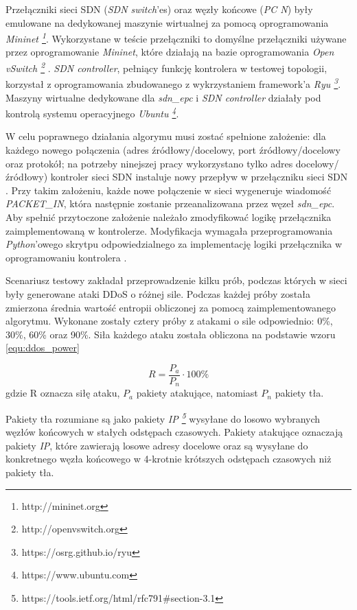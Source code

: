 Przełączniki sieci SDN (\textit{SDN switch}'es) oraz węzły końcowe (\textit{PC
  N}) były emulowane na dedykowanej maszynie wirtualnej za pomocą oprogramowania
\textit{Mininet \footnote{http://mininet.org}}. Wykorzystane w teście
przełączniki to domyślne przełączniki używane przez oprogramowanie
\textit{Mininet}, które działają na bazie oprogramowania
\textit{Open vSwitch \footnote{http://openvswitch.org}} \cite{mininetwiki}.
\textit{SDN controller}, pełniący funkcję kontrolera w testowej topologii,
korzystał z oprogramowania zbudowanego z wykrzystaniem framework'a
\textit{Ryu \footnote{https://osrg.github.io/ryu}}. Maszyny wirtualne dedykowane
dla \textit{sdn\_epc} i \textit{SDN controller} działały pod kontrolą systemu
operacyjnego \textit{Ubuntu \footnote{https://www.ubuntu.com}}.

W celu poprawnego działania algorymu musi zostać spełnione założenie: dla
każdego nowego połączenia (adres źródłowy/docelowy, port źródłowy/docelowy oraz
protokół; na potrzeby ninejszej pracy wykorzystano tylko adres
docelowy/źródłowy) kontroler sieci SDN instaluje nowy przepływ w przełączniku
sieci SDN \cite{mainddosarticle}. Przy takim założeniu, każde nowe połączenie w
sieci wygeneruje wiadomość \textit{PACKET\_IN}, która następnie zostanie
przeanalizowana przez węzeł \textit{sdn\_epc}. Aby spełnić przytoczone
założenie należało zmodyfikować logikę przełącznika zaimplementowaną w
kontrolerze. Modyfikacja wymagała przeprogramowania \textit{Python}'owego
skrytpu odpowiedzialnego za implementację logiki przełącznika w oprogramowaniu
kontrolera \cite{ryupage}.

Scenariusz testowy zakładał przeprowadzenie kilku prób, podczas których w sieci
były generowane ataki DDoS o różnej sile. Podczas każdej próby została zmierzona
średnia wartość entropii obliczonej za pomocą zaimplementowanego algorytmu.
Wykonane zostały cztery próby z atakami o sile odpowiednio: 0\%, 30\%, 60\% oraz
90\%. Siła każdego ataku została obliczona na podstawie wzoru
\ref{equ:ddos_power} \cite{mainddosarticle}

\begin{equation}
R = \frac{P_{a}}{P_{n}} \cdot 100\%
\label{equ:ddos_power}
\end{equation}
gdzie R oznacza siłę ataku, $P_{a}$ pakiety atakujące, natomiast $P_{n}$ pakiety
tła.

Pakiety tła rozumiane są jako pakiety
\textit{IP \footnote{https://tools.ietf.org/html/rfc791\#section-3.1}} wysyłane
do losowo wybranych węzłów końcowych w stałych odstępach czasowych. Pakiety
atakujące oznaczają pakiety \textit{IP}, które zawierają losowe adresy docelowe
oraz są wysyłane do konkretnego węzła końcowego w 4-krotnie krótszych odstępach
czasowych niż pakiety tła. 

